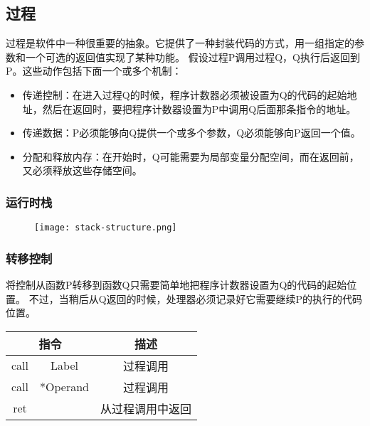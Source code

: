 \subsection{过程}

过程是软件中一种很重要的抽象。它提供了一种封装代码的方式，用一组指定的参数和一个可选的返回值实现了某种功能。
假设过程P调用过程Q，Q执行后返回到P。这些动作包括下面一个或多个机制：

\begin{itemize}
    \item 传递控制：在进入过程Q的时候，程序计数器必须被设置为Q的代码的起始地址，然后在返回时，要把程序计数器设置为P中调用Q后面那条指令的地址。
    \item 传递数据：P必须能够向Q提供一个或多个参数，Q必须能够向P返回一个值。
    \item 分配和释放内存：在开始时，Q可能需要为局部变量分配空间，而在返回前，又必须释放这些存储空间。
\end{itemize}

\subsubsection{运行时栈}
\begin{figure}[H]
    \centering
    \texttt{[image: stack-structure.png]}
\end{figure}

\subsubsection{转移控制}

将控制从函数P转移到函数Q只需要简单地把程序计数器设置为Q的代码的起始位置。
不过，当稍后从Q返回的时候，处理器必须记录好它需要继续P的执行的代码位置。

\begin{table}[H]
    \centering
    \begin{tabular}{|c c|c|}
        \hline
        \multicolumn{2}{|c|}{\textbf{指令}} & \textbf{描述}            \\
        \hline
        call                              & Label       & 过程调用     \\
        call                              & *Operand    & 过程调用     \\
        \hline
        ret                               &             & 从过程调用中返回 \\
        \hline
    \end{tabular}
\end{table}

